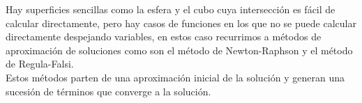 Hay superficies sencillas como la esfera y el cubo cuya intersección es fácil de calcular directamente, pero hay casos de funciones en los que no se puede calcular directamente despejando variables, en estos caso recurrimos a métodos de aproximación de soluciones como son el método de Newton-Raphson y el método de Regula-Falsi.
${ }$\\

Estos métodos parten de una aproximación inicial de la solución y generan una sucesión de términos que converge a la solución.